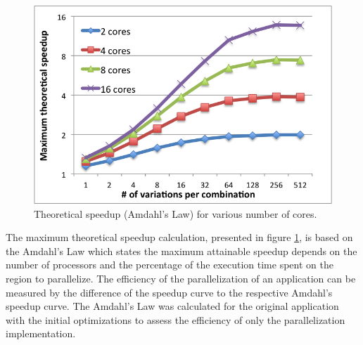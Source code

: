 \begin{figure}[!htp]
	\begin{center}
		\includegraphics[scale=0.7]{../../common/graphs/amdahl_speedup.png}
		\caption{Theoretical speedup (Amdahl's Law) for various number of cores.}
		\label{fig:AmdahlSpeedup}
	\end{center}
\end{figure}

The maximum theoretical speedup calculation, presented in figure \ref{fig:AmdahlSpeedup}, is based on the Amdahl's Law \cite{AMDAHL} which states the maximum attainable speedup depends on the number of processors and the percentage of the execution time spent on the region to parallelize. The efficiency of the parallelization of an application can be measured by the difference of the speedup curve to the respective Amdahl's speedup curve. The Amdahl's Law was calculated for the original application with the initial optimizations to assess the efficiency of only the parallelization implementation.

